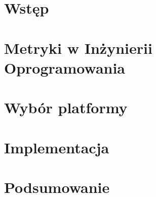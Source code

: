\chapter*{Wstęp}
\thispagestyle{empty}




\chapter{Metryki w Inżynierii Oprogramowania}
\setcounter{page}{1}




\chapter{Wybór platformy}

\chapter{Implementacja}


\chapter{Podsumowanie}

